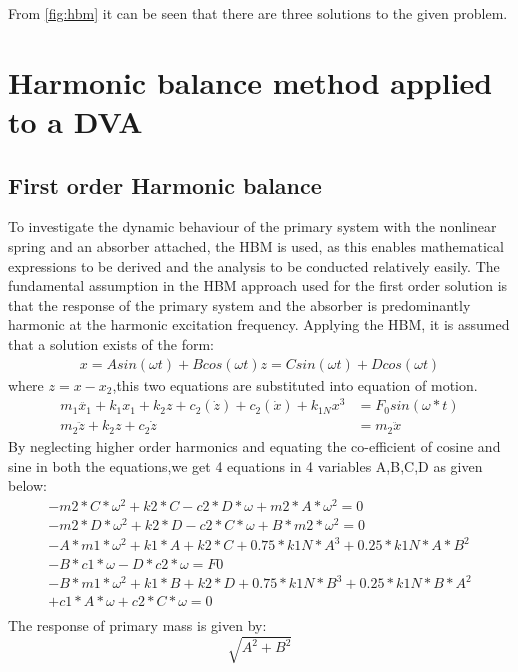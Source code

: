 From \ref{fig:hbm} it can be seen that there are three solutions to the given problem.

\section{Harmonic balance method applied to a DVA}
\subsection{First order Harmonic balance}
To investigate the dynamic behaviour of the primary system with the nonlinear spring and an absorber attached, the HBM is used, as this enables mathematical expressions to be derived and the analysis to be conducted relatively easily. The fundamental assumption in the HBM approach used for the first order solution is that the response of the primary system and the absorber is predominantly harmonic at the harmonic excitation frequency. Applying the HBM, it is assumed that a solution exists of the form:
\begin{align}
x=Asin(\omega t)+Bcos(\omega t)
z=Csin(\omega t)+Dcos(\omega t)
\end{align}
where $z=x-x_2$,this two equations are substituted into equation of motion.
\begin{align}
m_1\ddot{x_1}+k_1x_1+k_2z+c_2(\dot{z})+c_2(\dot{x})+k_{1N}x^3&=F_0sin(\omega *t) \\
m_2\ddot{z}+k_2z+c_{2}\dot{z}&=m_2\ddot{x}
\end{align}
By neglecting higher order harmonics and equating the co-efficient of cosine and sine in both the equations,we get 4  equations in 4 variables A,B,C,D as given below:
\begin{align}
-m2*C*\omega^2 + k2*C - c2*D*\omega + m2*A*\omega^2 = 0\\
-m2*D*\omega^2 + k2*D - c2*C*\omega + B*m2*\omega^2 = 0\\
-A*m1*\omega^2 + k1*A + k2*C + 0.75*k1N*A^3 + 0.25*k1N*A*B^2 \\- B*c1*\omega - D*c2*\omega = F0\\
-B*m1*\omega^2 + k1*B + k2*D + 0.75*k1N*B^3 + 0.25*k1N*B*A^2 \\ + c1*A*\omega + c2*C*\omega = 0\\
\end{align}
The response of primary mass is given by:$$\sqrt{A^2+B^2}$$

